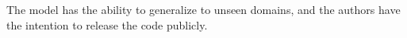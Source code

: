 The model has the ability to generalize to unseen domains, and the authors have the intention to release the code publicly.

